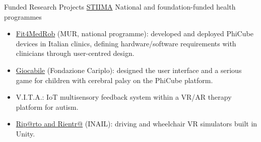 \cventry
{}
{Funded Research Projects}
{\textsc{\href{https://www.stiima.cnr.it/}{\color{blue}STIIMA}}}
{}
{}
{National and foundation-funded health programmes}
\begin{itemize}
    \item \href{https://www.fit4medrob.it/}{\color{blue}Fit4MedRob} (MUR, national programme): developed and deployed PhiCube devices in Italian clinics, defining hardware/software requirements with clinicians through user-centred design.
    \item \href{https://www.fondazionecariplo.it/it/progetti/ricerca/progetto-crew.html}{\color{blue}Giocabile} (Fondazione Cariplo): designed the user interface and a serious game for children with cerebral palsy on the PhiCube platform.
    \item V.I.T.A.: IoT multisensory feedback system within a VR/AR therapy platform for autism.
    \item \href{https://www.stiima.cnr.it/progetti-ricerca/riprto/}{\color{blue}Rip@rto and Rientr@} (INAIL): driving and wheelchair VR simulators built in Unity.
\end{itemize}
